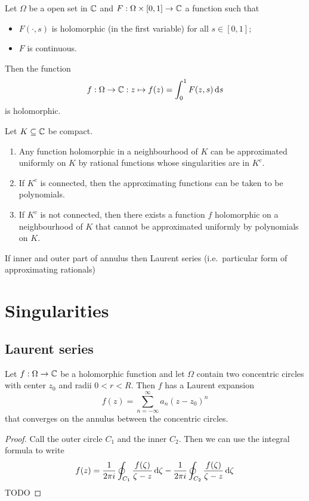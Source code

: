 \begin{proposition}
Let $\Omega$ be a open set in $\mathbb{C}$ and $F: \Omega\times[0,1]\to \mathbb{C}$ a function such that
\begin{itemize}
\item $F(\cdot,s)$ is holomorphic (in the first variable) for all $s\in [0,1]$;
\item $F$ is continuous.
\end{itemize}
Then the function
\[ f: \Omega \to \mathbb{C}: z\mapsto f(z) = \int_0^1F(z,s)\operatorname{d \!}{s} \]
is holomorphic.
\end{proposition}

\begin{proposition}
Let $K\subseteq \mathbb{C}$ be compact.
\begin{enumerate}
\item Any function holomorphic in a neighbourhood of $K$ can be approximated uniformly on $K$ by rational functions whose singularities are in $K^c$.
\item If $K^c$ is connected, then the approximating functions can be taken to be polynomials.
\item If $K^c$ is not connected, then there exists a function $f$ holomorphic on a neighbourhood of $K$ that cannot be approximated uniformly by polynomials on $K$.
\end{enumerate}
\end{proposition}
If inner and outer part of annulus then Laurent series (i.e.\ particular form of approximating rationals)

\section{Singularities}
\subsection{Laurent series}
\begin{proposition}
Let $f:\Omega \to \mathbb{C}$ be a holomorphic function and let $\Omega$ contain two concentric circles with center $z_0$ and radii $0<r< R$. Then $f$ has a Laurent expansion
\[ f(z) = \sum_{n=-\infty}^{\infty}a_n(z-z_0)^n \]
that converges on the annulus between the concentric circles.
\end{proposition}
\begin{proof}
Call the outer circle $C_1$ and the inner $C_2$. Then we can use the integral formula to write
\[ f(z) = \frac{1}{2\pi i}\oint_{C_1}\frac{f(\zeta)}{\zeta - z}\operatorname{d \!}{\zeta} - \frac{1}{2\pi i}\oint_{C_2}\frac{f(\zeta)}{\zeta - z}\operatorname{d \!}{\zeta} \]
TODO
\end{proof}

